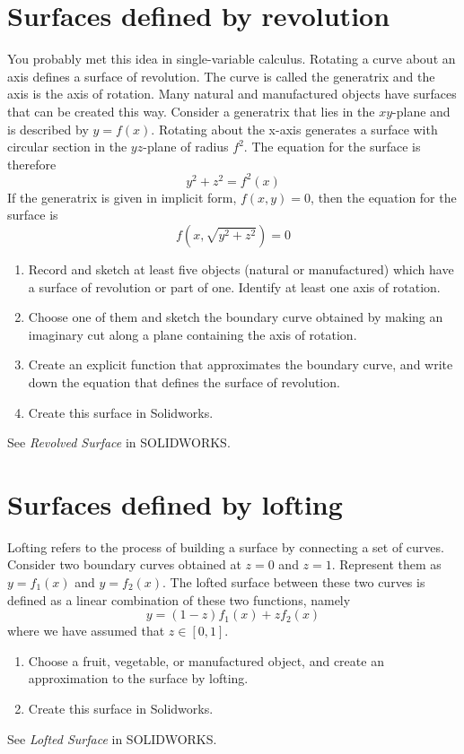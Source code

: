 \documentclass{tufte-handout}
\begin{document}
\section{Surfaces defined by revolution}

You probably met this idea in single-variable calculus. Rotating a curve about an axis defines a surface of revolution. The curve is called the generatrix and the axis is the axis of rotation. Many natural and manufactured objects have surfaces that can be created this way. Consider a generatrix that lies in the $xy$-plane and is described by $y=f(x)$. Rotating about the x-axis generates a surface with circular section in the $yz$-plane of radius $f^2$. The equation for the surface is therefore
\[y^2 + z^2 = f^2(x) \]
If the generatrix is given in implicit form, $f(x,y) = 0$, then the equation for the surface is
\[f(x,\sqrt{y^2+z^2}) = 0\]


\begin{enumerate}[resume]
\item Record and sketch at least five objects (natural or manufactured) which have a surface of revolution or part of one. Identify at least one axis of rotation.
\item Choose one of them and sketch the boundary curve obtained by making an imaginary cut along a plane containing the axis of rotation.
\item Create an explicit function that approximates the boundary curve, and write down the equation that defines the surface of revolution.
\item  Create this surface in Solidworks.
\end{enumerate}

See {\it Revolved Surface} in SOLIDWORKS.

\section{Surfaces defined by lofting}

Lofting refers to the process of building a surface by connecting a set of curves. Consider two boundary curves obtained at $z=0$ and $z=1$. Represent them as $y=f_1(x)$ and $y=f_2(x)$. The lofted surface between these two curves is defined as a linear combination of these two functions, namely
\[y = (1-z) f_1(x) + z f_2(x) \]
where we have assumed that $z \in [0,1]$.


\begin{enumerate}[resume]
\item Choose a fruit, vegetable, or manufactured object, and create an approximation to the surface by lofting.
\item  Create this surface in Solidworks.
\end{enumerate}

See {\it Lofted Surface} in SOLIDWORKS.
\end{document}
